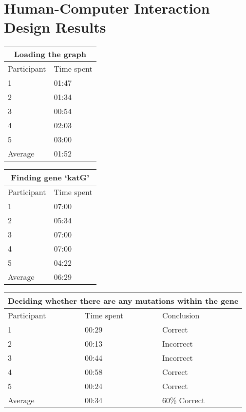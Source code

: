 \chapter{Human-Computer Interaction Design Results}
\label{ch:human-computer-interaction-design-results}

\begin{center}
	\begin{tabular}{| l | l |}
		\hline
		\multicolumn{2}{|c|}{Loading the graph} \\
		\hline
		Participant & Time spent\\
		\hline
		1 & 01:47\\
		2 & 01:34\\
		3 & 00:54\\
		4 & 02:03\\
		5 & 03:00\\
		\hline
		Average & 01:52\\
		\hline
	\end{tabular}
\end{center}

\begin{center}
	\begin{tabular}{| l | l |}
		\hline
		\multicolumn{2}{|c|}{Finding gene ‘katG’} \\
		\hline
		Participant & Time spent\\
		\hline
		1 & 07:00\\
		2 & 05:34\\
		3 & 07:00\\
		4 & 07:00\\
		5 & 04:22\\
		\hline
		Average & 06:29\\
		\hline
	\end{tabular}
\end{center}

\begin{center}
	\begin{tabular}{| l | l | l |}
		\hline
		\multicolumn{3}{|c|}{Deciding whether there are any mutations within the gene} \\
		\hline
		Participant & Time spent & Conclusion\\
		\hline
		1 & 00:29 & Correct\\
		2 & 00:13 & Incorrect\\
		3 & 00:44 & Incorrect\\
		4 & 00:58 & Correct\\
		5 & 00:24 & Correct\\
		\hline
		Average & 00:34 & 60\% Correct\\
		\hline
	\end{tabular}
\end{center}


